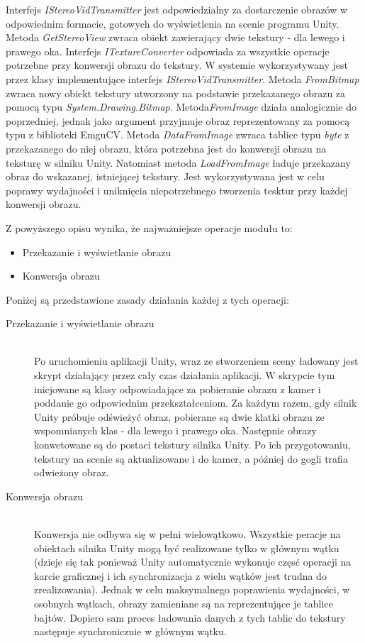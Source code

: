 \documentclass[a4paper,11pt,twoside]{report}
\theoremstyle{definition}
\begin{document}
Interfejs \textit{IStereoVidTransmitter} jest odpowiedzialny za dostarczenie obrazów w odpowiednim formacie, gotowych do wyświetlenia na scenie programu Unity. Metoda \textit{GetStereoView} zwraca obiekt zawierający dwie tekstury - dla lewego i prawego oka. 
Interfejs \textit{ITextureConverter} odpowiada za wszystkie operacje potrzebne przy konwersji obrazu do tekstury. W systemie wykorzystywany jest przez klasy implementujące interfejs \textit{IStereoVidTransmitter}. Metoda \textit{FromBitmap} zwraca nowy obiekt tekstury utworzony na podstawie przekazanego obrazu za pomocą typu \textit{System.Drawing.Bitmap}. Metoda\textit{FromImage} działa analogicznie do poprzedniej, jednak jako argument przyjmuje obraz reprezentowany za pomocą typu z biblioteki EmguCV.
Metoda \textit{DataFromImage} zwraca tablice typu \textit{byte} z przekazanego do niej obrazu, która potrzebna jest do konwersji obrazu na teksturę w silniku Unity. Natomiast metoda \textit{LoadFromImage}  ładuje przekazany obraz do wskazanej, istniejącej tekstury. Jest wykorzystywana jest w celu poprawy wydajności i uniknięcia niepotrzebnego tworzenia tesktur przy każdej konwersji obrazu.

Z powyższego opisu wynika, że najważniejsze operacje modułu to:
\begin{itemize}
\item Przekazanie i wyświetlanie obrazu
\item Konwersja obrazu
\end{itemize}

Poniżej są przedstawione zasady działania każdej z tych operacji:

\begin{description}
\item [Przekazanie i wyświetlanie obrazu] \hfill \\
Po uruchomieniu aplikacji Unity, wraz ze stworzeniem sceny ładowany jest skrypt działający przez cały czas działania aplikacji. W skrypcie tym inicjowane  są klasy odpowiadające za pobieranie obrazu z kamer i poddanie go odpowiednim przekształceniom. Za każdym razem, gdy silnik Unity próbuje odświeżyć obraz, pobierane są dwie klatki obrazu ze wspomnianych klas - dla lewego i prawego oka. Następnie obrazy konwetowane są do postaci tekstury silnika Unity. Po ich przygotowaniu, tekstury na scenie są aktualizowane i do kamer, a później do gogli trafia odwieżony obraz.
\item [Konwersja obrazu] \hfill \\
Konwersja nie odbywa się w pełni wielowątkowo. Wszystkie peracje na obiektach silnika Unity mogą być realizowane tylko w głównym wątku (dzieje się tak ponieważ Unity automatycznie wykonuje częsć operacji na karcie graficznej i ich synchronizacja z wielu wątków jest trudna do zrealizowania). Jednak w celu maksymalnego poprawienia wydajności, w osobnych wątkach, obrazy zamieniane są na reprezentujące je tablice bajtów. Dopiero sam proces ładowania danych z tych tablic do tekstury następuje synchronicznie w głównym wątku. 
\end{description}
\end{document}
